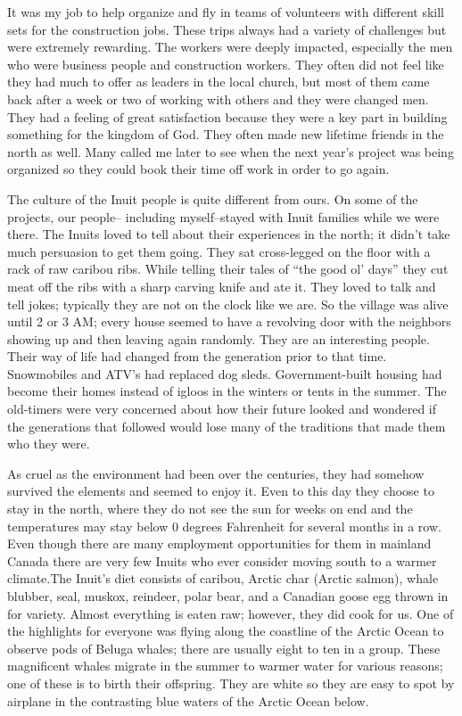 \documentclass[oneside]{book}
\begin{document}
It was my job to help organize and fly in teams of volunteers with different skill sets for the construction jobs. These trips always had a variety of challenges but were extremely rewarding. The workers were deeply impacted, especially the men who were business people and construction workers. They often did not feel like they had much to offer as leaders in the local church, but most of them came back after a week or two of working with others and they were changed men. They had a feeling of great satisfaction because they were a key part in building something for the kingdom of God. They often made new lifetime friends in the north as well. Many called me later to see when the next year’s project was being organized so they could book their time off work in order to go again.

The culture of the Inuit people is quite different from ours. On some of the projects, our people-- including myself--stayed with Inuit families while we were there. The Inuits loved to tell about their experiences in the north; it didn’t take much persuasion to get them going. They sat cross-legged on the floor with a rack of raw caribou ribs. While telling their tales of “the good ol’ days” they cut meat off the ribs with a sharp carving knife and ate it. They loved to talk and tell jokes; typically they are not on the clock like we are. So the village was alive until 2 or 3 AM; every house seemed to have a revolving door with the neighbors showing up and then leaving again randomly. They are an interesting people. Their way of life had changed from the generation prior to that time. Snowmobiles and ATV's had replaced dog sleds. Government-built housing had become their homes instead of igloos in the winters or tents in the summer. The old-timers were very concerned about how their future looked and wondered if the generations that followed would lose many of the traditions that made them who they were. 

As cruel as the environment had been over the centuries, they had somehow survived the elements and seemed to enjoy it. Even to this day they choose to stay in the north, where they do not see the sun for weeks on end and the temperatures may stay below 0 degrees Fahrenheit for several months in a row. Even though there are many employment opportunities for them in mainland Canada there are very few Inuits who ever consider moving south to a warmer climate.The Inuit's diet consists of caribou, Arctic char (Arctic salmon), whale blubber, seal, muskox, reindeer, polar bear, and a Canadian goose egg thrown in for variety. Almost everything is eaten raw; however, they did cook for us. One of the highlights for everyone was flying along the coastline of the Arctic Ocean to observe pods of Beluga whales; there are usually eight to ten in a group. These magnificent whales migrate in the summer to warmer water for various reasons; one of these is to birth their offspring. They are white so they are easy to spot by airplane in the contrasting blue waters of the Arctic Ocean below.
\end{document}
